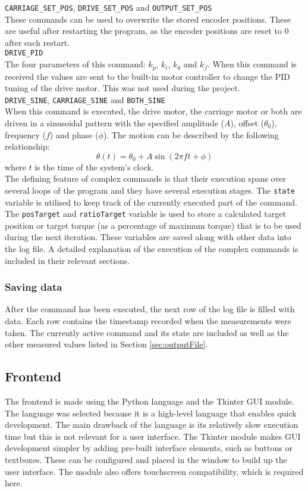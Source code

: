 \documentclass[12pt]{article}
\begin{document}
\verb|CARRIAGE_SET_POS|, \verb|DRIVE_SET_POS| and \verb|OUTPUT_SET_POS|\\

These commands can be used to overwrite the stored encoder positions. These are useful after restarting the program, as the encoder positions are reset to 0 after each restart.\\

\verb|DRIVE_PID|\\
The four parameters of this command: $k_p$, $k_i$, $k_d$ and $k_f$. When this command is received the values are sent to the built-in motor controller to change the PID tuning of the drive motor. This was not used during the project.\\

\verb|DRIVE_SINE|, \verb|CARRIAGE_SINE| and \verb|BOTH_SINE|\\
When this command is executed, the drive motor, the carriage motor or both are driven in a sinusoidal pattern with the specified amplitude ($A$), offset ($\theta_0$), frequency ($f$) and phase ($\phi$). The motion can be described by the following relationship: 
$$\theta(t) = \theta_0 + A\sin(2\pi ft +\phi)$$
where $t$ is the time of the system's clock.\\

The defining feature of complex commands is that their execution spans over several loops of the program and they have several execution stages. The \verb|state| variable is utilised to keep track of the currently executed part of the command. The \verb|posTarget| and \verb|ratioTarget| variable is used to store a calculated target position or target torque (as a percentage of maximum torque) that is to be used during the next iteration. These variables are saved along with other data into the log file. A detailed explanation of the execution of the complex commands is included in their relevant sections.
 


\subsubsection{Saving data}
After the command has been executed, the next row of the log file is filled with data. Each row contains the timestamp recorded when the measurements were taken. The currently active command and its state are included as well as the other measured values listed in Section \ref{sec:outputFile}. 


\subsection{Frontend}
The frontend is made using the Python language and the Tkinter GUI module. The language was selected because it is a high-level language that enables quick development. The main drawback of the language is its relatively slow execution time but this is not relevant for a user interface. The Tkinter module makes GUI development simpler by adding pre-built interface elements, such as buttons or textboxes. These can be configured and placed in the window to build up the user interface. The module also offers touchscreen compatibility, which is required here. 
\end{document}
